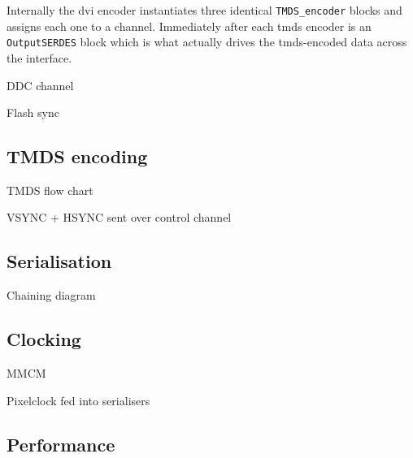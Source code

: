 Internally the \gls{dvi} encoder instantiates three identical \texttt{TMDS\_encoder} blocks and assigns each one to a channel. Immediately after each \gls{tmds} encoder is an \texttt{OutputSERDES} block which is what actually drives the \gls{tmds}-encoded data across the interface. 

DDC channel

Flash sync

\subsection{TMDS encoding}

TMDS flow chart

VSYNC + HSYNC sent over control channel

\subsection{Serialisation}

Chaining diagram

\subsection{Clocking}

MMCM

Pixelclock fed into serialisers

\subsection{Performance}